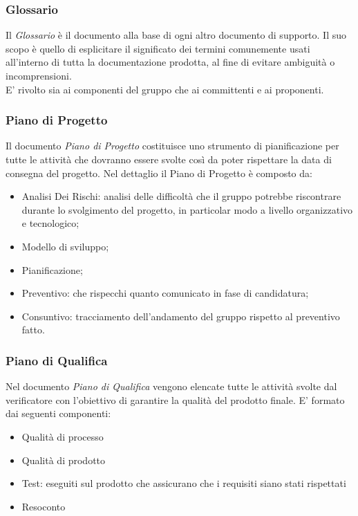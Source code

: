 \subsubsection{Glossario}
Il \textit{Glossario} è il documento alla base di ogni altro documento di supporto. Il suo scopo è quello di esplicitare il significato dei termini comunemente usati all'interno di tutta la documentazione prodotta, al fine di evitare ambiguità o incomprensioni. \\
E' rivolto sia ai componenti del gruppo che ai committenti e ai proponenti. 

\subsubsection{Piano di Progetto}
Il documento \textit{Piano di Progetto} costituisce uno strumento di pianificazione per tutte le attività che dovranno essere svolte così da poter rispettare la data di consegna del progetto.
Nel dettaglio il Piano di Progetto è composto da:
\begin{itemize}
    \item Analisi Dei Rischi: analisi delle difficoltà che il gruppo potrebbe riscontrare durante lo svolgimento del progetto, in particolar modo a livello organizzativo e tecnologico;
    \item Modello di sviluppo;
    \item Pianificazione;
    \item Preventivo: che rispecchi quanto comunicato in fase di candidatura;
    \item Consuntivo: tracciamento dell'andamento del gruppo rispetto al preventivo fatto.
\end{itemize}
\subsubsection{Piano di Qualifica}
Nel documento \textit{Piano di Qualifica} vengono elencate tutte le attività svolte dal verificatore con l'obiettivo di garantire la qualità del prodotto finale.
E' formato dai seguenti componenti:
\begin{itemize}
    \item Qualità di processo
    \item Qualità di prodotto
    \item Test: eseguiti sul prodotto che assicurano che i requisiti siano stati rispettati
    \item Resoconto
\end{itemize}
